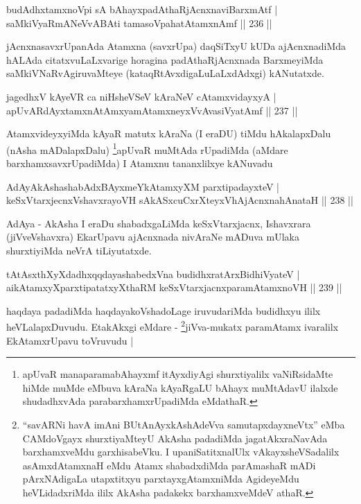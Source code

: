 \begin{shl}
budAdhxtamxnoV\s pi sA bAhayxpadAthaRjAcnxnaviBarxmAtf |\\
saMkiVyaRmANeVvA\s \s BAti tamasoVpahatAtamxnAmf \hfill || 236 ||
\end{shl}

\begin{artha}
jAcnxnasavxrUpanAda Atamxna (savxrUpa) daqSiTxyU kUDa ajAcnxnadiMda hALAda citatxvuLaLxvarige horagina padAthaRjAcnxnada BarxmeyiMda saMkiVNaRvAgiruvaMteye (kataqRtAvxdigaLuLaLxdAdxgi) kANutatxde.
\end{artha}

\begin{shl}
jagedhxV kAyeVR ca niHsheVSeV kAraNeV cA\s \s tamxvidayxyA |\\
apUvARdAyxtamxnA\s \s tAmx\s yamAtamxneyxVvAvasiVyatAmf \hfill || 237 ||
\end{shl}

\begin{artha}
AtamxvideyxyiMda kAyaR matutx kAraNa (I eraDU) tiMdu hAkalapxDalu 
(nAsha mADalapxDalu) \footnote{apUvaR manaparamabAhayxmf itAyxdiyAgi 
shurxtiyalilx vaNiRsidaMte hiMde muMde eMbuva kAraNa kAyaRgaLU bAhayx muMtAdavU ilalxde shudadhxvAda parabarxhamxrUpadiMda eMdathaR.}apUvaR muMtAda rUpadiMda (aMdare barxhamxsavxrUpadiMda) I Atamxnu tananxlilxye kANuvadu
\end{artha}


\begin{shl}
AdAyAkAshashabAdxBAyxmeYkAtamxyXM parxtipadayxteV |\\
keSxVtarxjecnxVshavxrayoVH sAkASxcuCxrXteyxVhAjAcnxnahAnataH \hfill || 238 ||
\end{shl}

\begin{artha}
AdAya - AkAsha I eraDu shabadxgaLiMda keSxVtarxjacnx, Ishavxrara (jiVveVshavxra) EkarUpavu ajAcnxnada nivAraNe mADuva mUlaka shurxtiyiMda neVrA tiLiyutatxde.
\end{artha}

\begin{shl}
tAtAsxthXyXdadhxqqdayashabedxVna budidhxratArxBidhiVyateV |\\
aikAtamxyXparxtipatatxyXthaRM keSxVtarxjacnxparamAtamxnoVH \hfill || 239 ||
\end{shl}

\begin{artha}
haqdaya padadiMda haqdayakoVshadoLage iruvudariMda budidhxyu ililx 
heVLalapxDuvudu. EtakAkxgi eMdare - \footnote{``savARNi havA imAni BUtAnAyxkAshAdeVva samutapxdayxneVtx'' eMba 
CAMdoVgayx shurxti\-yaMteyU AkAsha padadiMda jagatAkxraNavAda barxhamxveMdu garxhisabeVku. I upaniSatitxnalUlx vAkayxsheVSadalilx asAmxdAtamxnaH eMdu Atamx shabadxdiMda parAmashaR mADi pArxNAdigaLa utapxtitxyu parxtayxgAtamxniMda AgideyeMdu heVLidadxriMda ililx AkAsha padakekx barxhamxveMdeV athaR.}jiVva-mukatx paramAtamx ivaralilx EkAtamxrUpavu toVruvudu |
\end{artha}

